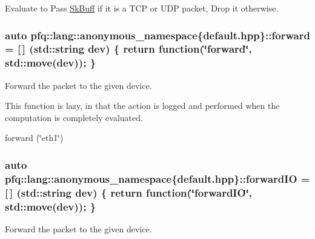 Evaluate to {\ttfamily Pass} \hyperlink{structpfq_1_1lang_1_1SkBuff}{Sk\+Buff} if it is a T\+CP or U\+DP packet, {\ttfamily Drop} it otherwise. 

\subsubsection[{\texorpdfstring{forward}{forward}}]{\setlength{\rightskip}{0pt plus 5cm}auto pfq\+::lang\+::anonymous\+\_\+namespace\{default.\+hpp\}\+::forward = \mbox{[}$\,$\mbox{]} (std\+::string dev) \{ return {\bf function}(\char`\"{}forward\char`\"{}, std\+::move(dev)); \}}\hypertarget{namespacepfq_1_1lang_1_1anonymous__namespace_02default_8hpp_03_aae08247030fea0f5e398b0a03d382257}{}\label{namespacepfq_1_1lang_1_1anonymous__namespace_02default_8hpp_03_aae08247030fea0f5e398b0a03d382257}


Forward the packet to the given device. 

This function is lazy, in that the action is logged and performed when the computation is completely evaluated.

forward (\char`\"{}eth1\char`\"{}) 
\subsubsection[{\texorpdfstring{forward\+IO}{forwardIO}}]{\setlength{\rightskip}{0pt plus 5cm}auto pfq\+::lang\+::anonymous\+\_\+namespace\{default.\+hpp\}\+::forward\+IO = \mbox{[}$\,$\mbox{]} (std\+::string dev) \{ return {\bf function}(\char`\"{}forward\+IO\char`\"{}, std\+::move(dev)); \}}\hypertarget{namespacepfq_1_1lang_1_1anonymous__namespace_02default_8hpp_03_a3fb6ec42e38c3329534ea3a7024fd967}{}\label{namespacepfq_1_1lang_1_1anonymous__namespace_02default_8hpp_03_a3fb6ec42e38c3329534ea3a7024fd967}


Forward the packet to the given device. 


